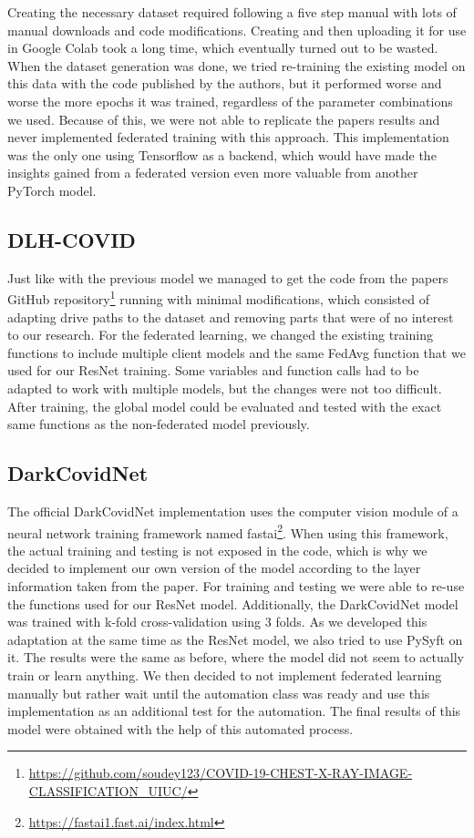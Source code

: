 Creating the necessary dataset required following a five step manual with lots of manual downloads and code modifications. Creating and then uploading it for use in Google Colab took a long time, which eventually turned out to be wasted. When the dataset generation was done, we tried re-training the existing model on this data with the code published by the authors, but it performed worse and worse the more epochs it was trained, regardless of the parameter combinations we used. Because of this, we were not able to replicate the papers results and never implemented federated training with this approach. This implementation was the only one using Tensorflow as a backend, which would have made the insights gained from a federated version even more valuable from another PyTorch model.

\newpage
\subsection{DLH-COVID}
Just like with the previous model we managed to get the code from the papers GitHub repository\footnote{\url{https://github.com/soudey123/COVID-19-CHEST-X-RAY-IMAGE-CLASSIFICATION_UIUC/}} running with minimal modifications, which consisted of adapting drive paths to the dataset and removing parts that were of no interest to our research.
For the federated learning, we changed the existing training functions to include multiple client models and the same FedAvg function that we used for our ResNet training. Some variables and function calls had to be adapted to work with multiple models, but the changes were not too difficult. After training, the global model could be evaluated and tested with the exact same functions as the non-federated model previously.  

\subsection{DarkCovidNet}
The official DarkCovidNet implementation uses the computer vision module of a neural network training framework named fastai\footnote{\url{https://fastai1.fast.ai/index.html}}. When using this framework, the actual training and testing is not exposed in the code, which is why we decided to implement our own version of the model according to the layer information taken from the paper. For training and testing we were able to re-use the functions used for our ResNet model. Additionally, the DarkCovidNet model was trained with k-fold cross-validation using 3 folds.
As we developed this adaptation at the same time as the ResNet model, we also tried to use PySyft on it. The results were the same as before, where the model did not seem to actually train or learn anything.
We then decided to not implement federated learning manually but rather wait until the automation class was ready and use this implementation as an additional test for the automation. The final results of this model were obtained with the help of this automated process.

